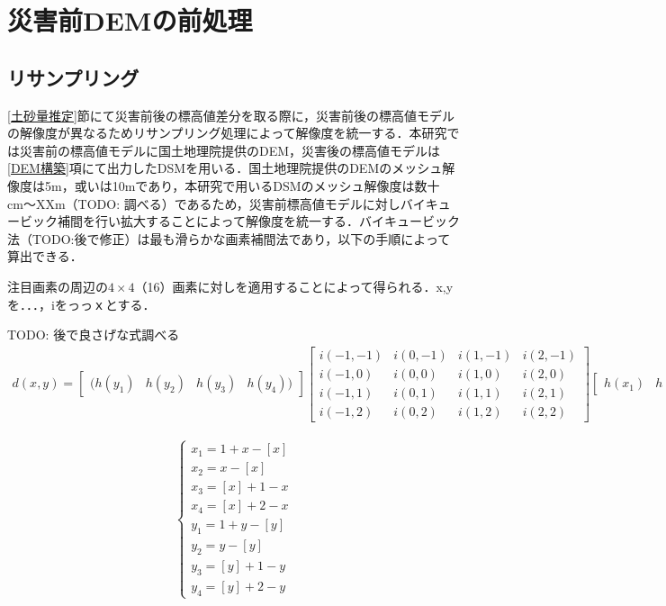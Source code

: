   \section{災害前DEMの前処理}
    \subsection{リサンプリング}
      \ref{土砂量推定}節にて災害前後の標高値差分を取る際に，災害前後の標高値モデルの解像度が異なるためリサンプリング処理によって解像度を統一する．本研究では災害前の標高値モデルに国土地理院提供のDEM，災害後の標高値モデルは\ref{DEM構築}項にて出力したDSMを用いる．国土地理院提供のDEMのメッシュ解像度は5m，或いは10mであり，本研究で用いるDSMのメッシュ解像度は数十cm〜XXm（TODO: 調べる）であるため，災害前標高値モデルに対しバイキュービック補間\cite{論文手法1}を行い拡大することによって解像度を統一する．バイキュービック法（TODO:後で修正）は最も滑らかな画素補間法であり，以下の手順によって算出できる．
      
      注目画素の周辺の$4\times4$（16）画素に対しを適用することによって得られる．x,yを．．．，iをっっｘとする．

      TODO: 後で良さげな式調べる
      \begin{eqnarray}
        \label{バイキュービック法1}
          d(x,y) = 
          \begin{bmatrix}
          (h(y_{1}) & h(y_{2}) & h(y_{3}) & h(y_{4}))
          \end{bmatrix}
          \begin{bmatrix}
            i(-1,-1) & i(0,-1) & i(1,-1) & i(2,-1) \\
            i(-1,0) & i(0,0) & i(1,0) & i(2,0) \\
            i(-1,1) & i(0,1) & i(1,1) & i(2,1) \\
            i(-1,2) & i(0,2) & i(1,2) & i(2,2)
          \end{bmatrix}
          \begin{bmatrix}
            h(x_{1}) & h(x_{2}) & h(x_{3}) & h(x_{4})
          \end{bmatrix}
        \end{eqnarray}
  
        \begin{eqnarray}
          \label{バイキュービック法2}
            \left\{
              \begin{array}{l}
                x_{1} = 1 + x - [x] \\
                x_{2} = x - [x]     \\
                x_{3} = [x] + 1 - x \\
                x_{4} = [x] + 2 - x \\
                y_{1} = 1 + y - [y] \\
                y_{2} = y - [y]     \\
                y_{3} = [y] + 1 - y \\
                y_{4} = [y] + 2 - y
              \end{array}
            \right.
          \end{eqnarray}

